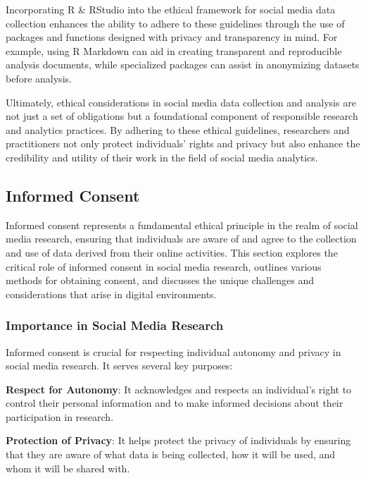 \documentclass[
]{book}
\begin{document}
Incorporating R \& RStudio into the ethical framework for social media data collection enhances the ability to adhere to these guidelines through the use of packages and functions designed with privacy and transparency in mind. For example, using R Markdown can aid in creating transparent and reproducible analysis documents, while specialized packages can assist in anonymizing datasets before analysis.

Ultimately, ethical considerations in social media data collection and analysis are not just a set of obligations but a foundational component of responsible research and analytics practices. By adhering to these ethical guidelines, researchers and practitioners not only protect individuals' rights and privacy but also enhance the credibility and utility of their work in the field of social media analytics.

\hypertarget{informed-consent}{%
\subsection*{Informed Consent}\label{informed-consent}}

Informed consent represents a fundamental ethical principle in the realm of social media research, ensuring that individuals are aware of and agree to the collection and use of data derived from their online activities. This section explores the critical role of informed consent in social media research, outlines various methods for obtaining consent, and discusses the unique challenges and considerations that arise in digital environments.

\hypertarget{importance-in-social-media-research}{%
\subsubsection*{Importance in Social Media Research}\label{importance-in-social-media-research}}

Informed consent is crucial for respecting individual autonomy and privacy in social media research. It serves several key purposes:

\textbf{Respect for Autonomy}: It acknowledges and respects an individual's right to control their personal information and to make informed decisions about their participation in research.

\textbf{Protection of Privacy}: It helps protect the privacy of individuals by ensuring that they are aware of what data is being collected, how it will be used, and whom it will be shared with.
\end{document}
